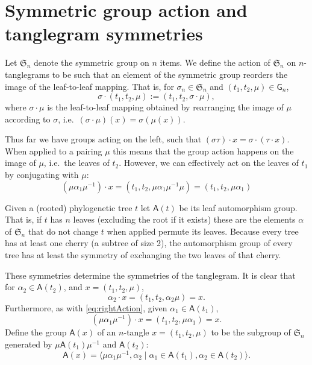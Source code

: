 \documentclass{amsart}
\newcommand{\fS}{\mathfrak S}
\newcommand{\aut}{\mathsf A}
\newcommand{\pairing}{\mu}
\newcommand{\tangle}{\mathsf{G}}
\begin{document}
\section{Symmetric group action and tanglegram symmetries}
Let $\fS_n$ denote the symmetric group on $n$ items.
We define the action of $\fS_n$ on $n$-tanglegrams to be such that an element of the symmetric group reorders the image of the leaf-to-leaf mapping.
That is, for $\sigma_n \in \fS_n$ and $(t_1, t_2, \pairing) \in \tangle_n$,
\[
\sigma \cdot (t_1, t_2, \pairing) := (t_1, t_2, \sigma \cdot \pairing),
\]
where $\sigma \cdot \pairing$ is the leaf-to-leaf mapping obtained by rearranging the image of $\pairing$ according to $\sigma$, i.e.\ $(\sigma \cdot \pairing)(x) = \sigma(\pairing(x))$.

Thus far we have groups acting on the left, such that $(\sigma \tau) \cdot x = \sigma \cdot (\tau \cdot x)$.
When applied to a pairing $\mu$ this means that the group action happens on the image of $\mu$, i.e.\ the leaves of $t_2$.
However, we can effectively act on the leaves of $t_1$ by conjugating with $\pairing$:
\begin{equation}
\label{eq:rightAction}
(\pairing \alpha_1 \pairing^{-1}) \cdot x
= (t_1, t_2, \pairing \alpha_1 \pairing^{-1} \pairing)
= (t_1, t_2, \pairing \alpha_1)
\end{equation}

Given a (rooted) phylogenetic tree $t$ let $\aut(t)$ be its leaf automorphism group.
That is, if $t$ has $n$ leaves (excluding the root if it exists) these are the elements $\alpha$ of $\fS_n$ that do not change $t$ when applied permute its leaves.
Because every tree has at least one cherry (a subtree of size 2), the automorphism group of every tree has at least the symmetry of exchanging the two leaves of that cherry.

These symmetries determine the symmetries of the tanglegram.
It is clear that for $\alpha_2 \in \aut(t_2)$, and $x = (t_1, t_2, \pairing)$,
\[
\alpha_2 \cdot x = (t_1, t_2, \alpha_2 \pairing) = x.
\]
Furthermore, as with \eqref{eq:rightAction}, given $\alpha_1 \in \aut(t_1)$,
\[
(\pairing \alpha_1 \pairing^{-1}) \cdot x = (t_1, t_2, \pairing \alpha_1) = x.
\]
Define the group $\aut(x)$ of an $n$-tangle $x = (t_1, t_2, \pairing)$ to be the subgroup of $\fS_n$ generated by $\pairing \aut(t_1) \pairing^{-1}$ and $\aut(t_2)$:
\[
\aut(x) = \langle \pairing \alpha_1 \pairing^{-1}, \alpha_2 \mid \alpha_1 \in \aut(t_1), \alpha_2 \in \aut(t_2) \rangle.
\]
\end{document}
